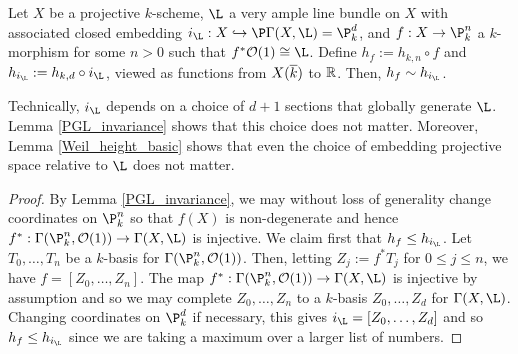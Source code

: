 \documentclass[11pt]{article}
\begin{document}
\begin{lemma}\label{Weil_height_basic}
Let $X$ be a projective $k$-scheme, $\L$ a very ample line bundle on $X$ with associated closed embedding $i_{\L}: X\inj\P\Gamma(X,\L)=\P_k^d$, and $f: X\to\P_k^n$ a $k$-morphism for some $n>0$ such that $f^*\O(1)\iso\L$. Define $h_f:=h_{k,n}\circ f$ and $h_{i_{\L}}:=h_{k,d}\circ i_{\L}$, viewed as functions from $X(\overline{k})$ to $\mathbb{R}$. Then, $h_f\sim h_{i_{\L}}$.
\end{lemma}

Technically, $i_{\L}$ depends on a choice of $d+1$ sections that globally generate $\L$. Lemma \ref{PGL_invariance} shows that this choice does not matter. Moreover, Lemma \ref{Weil_height_basic} shows that even the choice of embedding projective space relative to $\L$ does not matter.

\begin{proof}
By Lemma \ref{PGL_invariance}, we may without loss of generality change coordinates on $\P_k^n$ so that $f(X)$ is non-degenerate and hence $f^*: \Gamma(\P_k^n,\O(1))\to\Gamma(X,\L)$ is injective. We claim first that $h_f\leq h_{i_{\L}}$. Let $T_0,\ldots,T_n$ be a $k$-basis for $\Gamma(\P_k^n,\O(1))$. Then, letting $Z_j:=f^*T_j$ for $0\leq j\leq n$, we have $f=[Z_0,\ldots,Z_n]$. The map $f^*: \Gamma(\P_k^n,\O(1))\to\Gamma(X,\L)$ is injective by assumption and so we may complete $Z_0,\ldots,Z_n$ to a $k$-basis $Z_0,\ldots,Z_d$ for $\Gamma(X,\L)$. Changing coordinates on $\P_k^d$ if necessary, this gives $i_{\L}=[Z_0,\ldots,Z_d]$ and so $h_f\leq h_{i_{\L}}$ since we are taking a maximum over a larger list of numbers. 


\end{proof}
\end{document}

